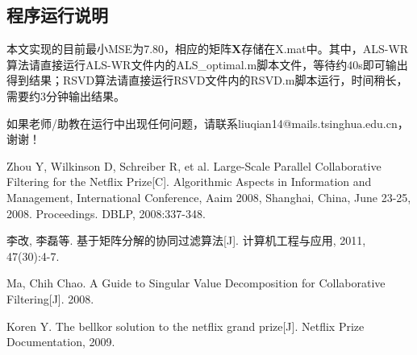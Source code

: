 \documentclass[11pt]{article}
\begin{document}
\subsection{程序运行说明}
本文实现的目前最小MSE为7.80，相应的矩阵\textbf{X}存储在X.mat中。其中，ALS-WR算法请直接运行ALS-WR文件内的ALS\_optimal.m脚本文件，等待约40s即可输出得到结果；RSVD算法请直接运行RSVD文件内的RSVD.m脚本运行，时间稍长，需要约3分钟输出结果。

如果老师/助教在运行中出现任何问题，请联系liuqian14@mails.tsinghua.edu.cn，谢谢！


\begin{thebibliography}{1}
Zhou Y, Wilkinson D, Schreiber R, et al. Large-Scale Parallel Collaborative Filtering for the Netflix Prize[C]. Algorithmic Aspects in Information and Management, International Conference, Aaim 2008, Shanghai, China, June 23-25, 2008. Proceedings. DBLP, 2008:337-348.

李改, 李磊等. 基于矩阵分解的协同过滤算法[J]. 计算机工程与应用, 2011, 47(30):4-7.

Ma, Chih Chao. A Guide to Singular Value Decomposition for Collaborative Filtering[J]. 2008.

Koren Y. The bellkor solution to the netflix grand prize[J]. Netflix Prize Documentation, 2009.
\end{thebibliography}
\end{document}
